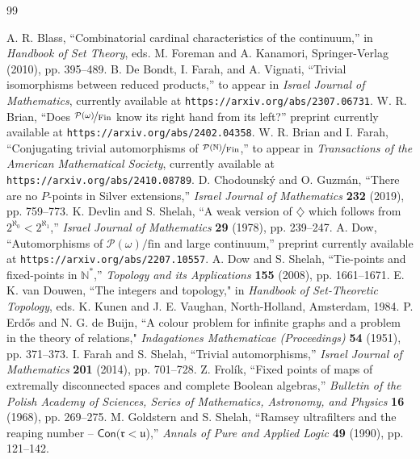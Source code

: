 \documentclass[11pt,leqno]{amsart}
\theoremstyle{definition}
\theoremstyle{remark}
\newcommand{\N}{\mathbb{N}}
\newcommand{\<}{\langle}
\renewcommand{\>}{\rangle}
\newcommand{\w}{\omega}
\newcommand{\0}{\emptyset}
\newcommand{\1}{1\hspace{-1.75mm}1}
\newcommand{\pwmf}{\nicefrac{\mathcal{P}(\w)}{\mathrm{Fin}}}
\newcommand{\pnmf}{\nicefrac{\mathcal{P}(\N)}{\mathrm{Fin}}}
\begin{document}
\begin{thebibliography}{99}

 A. R. Blass, ``Combinatorial cardinal characteristics of the continuum,'' in \emph{Handbook of Set Theory}, eds. M. Foreman and A. Kanamori, Springer-Verlag (2010), pp. 395--489.
 B. De Bondt, I. Farah, and A. Vignati, ``Trivial isomorphisms between reduced products,'' to appear in \emph{Israel Journal of Mathematics}, currently available at \texttt{https://arxiv.org/abs/2307.06731}.
 W. R. Brian, ``Does $\pwmf$ know its right hand from its left?'' preprint currently available at \texttt{https://arxiv.org/abs/2402.04358}.
 W. R. Brian and I. Farah, ``Conjugating trivial automorphisms of $\pnmf$,'' to appear in \emph{Transactions of the American Mathematical Society}, currently available at \texttt{https://arxiv.org/abs/2410.08789}.
 D. Chodounsk\'y and O. Guzm\'an, ``There are no $P$-points in Silver extensions,'' \emph{Israel Journal of Mathematics} \textbf{232} (2019), pp. 759--773.
 K. Devlin and S. Shelah, ``A weak version of $\diamondsuit$ which follows from $2^{\aleph_0} < 2^{\aleph_1}$,'' \emph{Israel Journal of Mathematics} \textbf{29} (1978), pp. 239--247.
 A. Dow, ``Automorphisms of $\mathcal P(\w)/\mathrm{fin}$ and large continuum,'' preprint currently available at \texttt{https://arxiv.org/abs/2207.10557}.
 A. Dow and S. Shelah, ``Tie-points and fixed-points in $\N^*$,'' \emph{Topology and its Applications} \textbf{155} (2008), pp. 1661--1671.
 E. K. van Douwen, ``The integers and topology," in \emph{Handbook of Set-Theoretic Topology}, eds. K. Kunen and J. E. Vaughan, North-Holland, Amsterdam, 1984.
 P. Erd\H{o}s and N. G. de Buijn, ``A colour problem for infinite graphs and a problem in the theory of relations," \emph{Indagationes Mathematicae (Proceedings)} \textbf{54} (1951), pp. 371--373.
 I. Farah and S. Shelah, ``Trivial automorphisms,'' \emph{Israel Journal of Mathematics} \textbf{201} (2014), pp. 701--728.
 Z. Frol\'ik, ``Fixed points of maps of extremally disconnected spaces and complete Boolean algebras,'' \emph{Bulletin of the Polish Academy of Sciences, Series of Mathematics, Astronomy, and Physics} \textbf{16} (1968), pp. 269--275. 
 M. Goldstern and S. Shelah, ``Ramsey ultrafilters and the reaping number -- {$\mathsf{Con}(\mathfrak r < \mathfrak u$),''} \emph{Annals of Pure and Applied Logic} \textbf{49} (1990), pp. 121--142.

\end{thebibliography}
\end{document}
